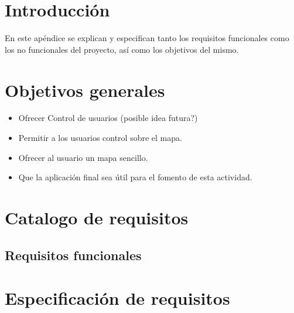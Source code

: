 
\section{Introducción}
En este apéndice se explican y especifican tanto los requisitos funcionales como los no funcionales del proyecto, así como los objetivos del mismo.

\section{Objetivos generales}

\begin{itemize}
    \item Ofrecer Control de usuarios (posible idea futura?)
    \item Permitir a los usuarios control sobre el mapa.
    \item Ofrecer al usuario un mapa sencillo.
    \item Que la aplicación final sea útil para el fomento de esta actividad.
\end{itemize}

\section{Catalogo de requisitos}

\subsection{Requisitos funcionales}

\section{Especificación de requisitos}


